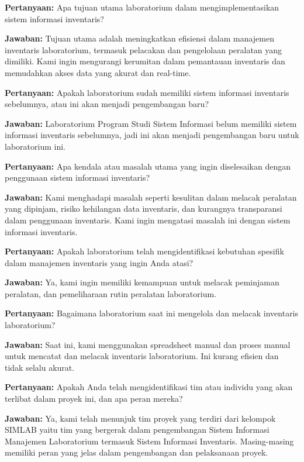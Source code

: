 \begin{flushleft}
  \textbf{Pertanyaan:} Apa tujuan utama laboratorium dalam mengimplementasikan sistem informasi inventaris?

  \textbf{Jawaban:} Tujuan utama adalah meningkatkan efisiensi dalam manajemen inventaris laboratorium, termasuk pelacakan dan pengelolaan peralatan yang dimiliki. Kami ingin mengurangi kerumitan dalam pemantauan inventaris dan memudahkan akses data yang akurat dan real-time.

  \textbf{Pertanyaan:} Apakah laboratorium sudah memiliki sistem informasi inventaris sebelumnya, atau ini akan menjadi pengembangan baru?

  \textbf{Jawaban:} Laboratorium Program Studi Sistem Informasi belum memiliki sistem informasi inventaris sebelumnya, jadi ini akan menjadi pengembangan baru untuk laboratorium ini.

  \textbf{Pertanyaan:} Apa kendala atau masalah utama yang ingin diselesaikan dengan penggunaan sistem informasi inventaris?

  \textbf{Jawaban:} Kami menghadapi masalah seperti kesulitan dalam melacak peralatan yang dipinjam, risiko kehilangan data inventaris, dan kurangnya transparansi dalam penggunaan inventaris. Kami ingin mengatasi masalah ini dengan sistem informasi inventaris.

  \textbf{Pertanyaan:} Apakah laboratorium telah mengidentifikasi kebutuhan spesifik dalam manajemen inventaris yang ingin Anda atasi?

  \textbf{Jawaban:} Ya, kami ingin memiliki kemampuan untuk melacak peminjaman peralatan, dan pemeliharaan rutin peralatan laboratorium.

  \textbf{Pertanyaan:} Bagaimana laboratorium saat ini mengelola dan melacak inventaris laboratorium?

  \textbf{Jawaban:} Saat ini, kami menggunakan spreadsheet manual dan proses manual untuk mencatat dan melacak inventaris laboratorium. Ini kurang efisien dan tidak selalu akurat.

  \textbf{Pertanyaan:} Apakah Anda telah mengidentifikasi tim atau individu yang akan terlibat dalam proyek ini, dan apa peran mereka?

  \textbf{Jawaban:} Ya, kami telah menunjuk tim proyek yang terdiri dari kelompok SIMLAB yaitu tim yang bergerak dalam pengembangan Sistem Informasi Manajemen Laboratorium termasuk Sistem Informasi Inventaris. Masing-masing memiliki peran yang jelas dalam pengembangan dan pelaksanaan proyek.


\end{flushleft}
